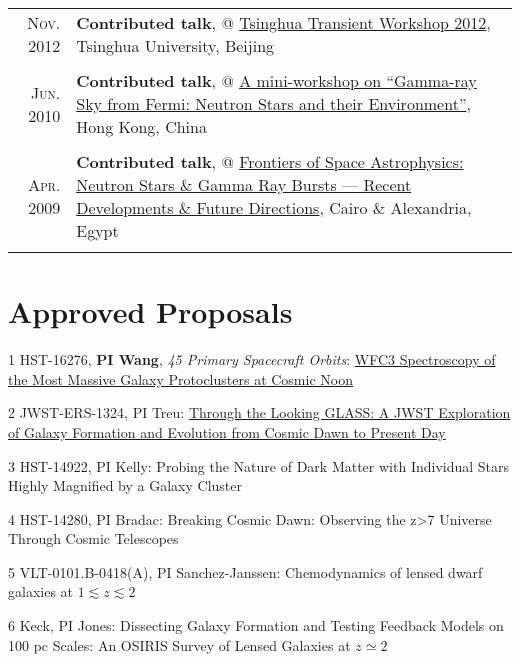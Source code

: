 \documentclass[letterpaper,10pt]{article}
\newcommand{\textwrap}{5.8in}       %
\begin{document}
\begin{longtable}{r|p{\textwrap}}
    \textsc{Nov. 2012}   &   \textbf{Contributed talk}, @ \href{http://www.phys.tsinghua.edu.cn/publish/phy/5287/2012/20121102084855753317440/20121102084855753317440_.html}{Tsinghua Transient Workshop 2012}, Tsinghua University, Beijing   \\
    \multicolumn{2}{c}{} \\

    \textsc{Jun. 2010}   &   \textbf{Contributed talk}, @ \href{http://www.physics.hku.hk/~astro/2010Astro/Index.htm}{A mini-workshop on ``Gamma-ray Sky from Fermi: Neutron Stars and their Environment''}, Hong Kong, China  \\
    \multicolumn{2}{c}{} \\

    \textsc{Apr. 2009}   &   \textbf{Contributed talk}, @ \href{http://www.ns-grb.com/index0.html}{Frontiers of Space Astrophysics: Neutron Stars \& Gamma Ray Bursts --- Recent Developments \& Future Directions}, Cairo \& Alexandria, Egypt     \\
    \multicolumn{2}{c}{}

\end{longtable}
\endgroup


\vspace*{-.7em}
\section{Approved Proposals}

\begin{list}{}{\leftmargin=1.7em}
    \vspace*{1ex}
    \item[1] HST-16276, \textbf{PI Wang}, \emph{45 Primary Spacecraft Orbits}: \href{https://archive.stsci.edu/proposal_search.php?id=16276&mission=hst}{WFC3 Spectroscopy of the Most Massive Galaxy Protoclusters at Cosmic Noon}
    \item[2] JWST-ERS-1324, PI Treu: \href{https://www.stsci.edu/jwst/observing-programs/approved-ers-programs/program-1324}{Through the Looking GLASS: A JWST Exploration of Galaxy Formation and Evolution from Cosmic Dawn to Present Day}
    \item[3] HST-14922, PI Kelly: Probing the Nature of Dark Matter with Individual Stars Highly Magnified by a Galaxy Cluster
    \item[4] HST-14280, PI Bradac: Breaking Cosmic Dawn: Observing the z>7 Universe Through Cosmic Telescopes
    \item[5] VLT-0101.B-0418(A), PI Sanchez-Janssen: Chemodynamics of lensed dwarf galaxies at $1\lesssim z\lesssim 2$
    \item[6] Keck, PI Jones: Dissecting Galaxy Formation and Testing Feedback Models on 100 pc Scales: An OSIRIS Survey of Lensed Galaxies at $z\simeq2$
\end{list}
\end{document}
